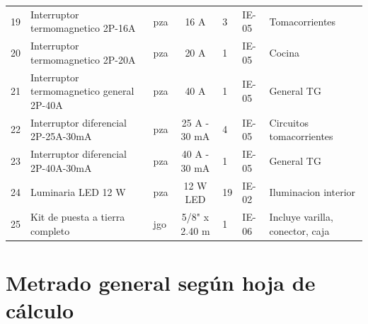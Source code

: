 \begin{landscape}
\begin{table}[H]
\begin{tabularx}{\textwidth}{c L{4.8cm} L{2.2cm} c L{1.8cm} L{3.0cm} Y}
19 & Interruptor termomagnetico 2P-16A & pza & 16 A & 3 & IE-05 & Tomacorrientes \\
20 & Interruptor termomagnetico 2P-20A & pza & 20 A & 1 & IE-05 & Cocina \\
21 & Interruptor termomagnetico general 2P-40A & pza & 40 A & 1 & IE-05 & General TG \\
22 & Interruptor diferencial 2P-25A-30mA & pza & 25 A - 30 mA & 4 & IE-05 & Circuitos tomacorrientes \\
23 & Interruptor diferencial 2P-40A-30mA & pza & 40 A - 30 mA & 1 & IE-05 & General TG \\
24 & Luminaria LED 12 W & pza & 12 W LED & 19 & IE-02 & Iluminacion interior \\
25 & Kit de puesta a tierra completo & jgo & 5/8" x 2.40 m & 1 & IE-06 & Incluye varilla, conector, caja \\
\bottomrule
\end{tabularx}
\end{table}
\end{landscape}

\section{Metrado general según hoja de cálculo}

